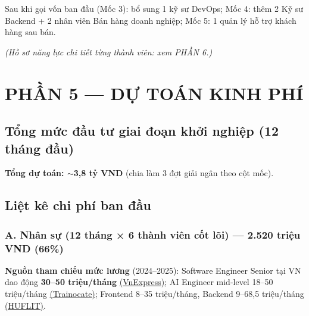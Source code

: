 \documentclass[11pt,a4paper]{article}
\begin{document}
Sau khi gọi vốn ban đầu (Mốc 3): bổ sung 1 kỹ sư DevOps; Mốc 4: thêm 2 Kỹ sư Backend + 2 nhân viên Bán hàng doanh nghiệp; Mốc 5: 1 quản lý hỗ trợ khách hàng sau bán.

\textit{(Hồ sơ năng lực chi tiết từng thành viên: xem PHẦN 6.)}

\newpage
\section{PHẦN 5 --- DỰ TOÁN KINH PHÍ}

\subsection{Tổng mức đầu tư giai đoạn khởi nghiệp (12 tháng đầu)}

\textbf{Tổng dự toán: $\sim$3,8 tỷ VND} (chia làm 3 đợt giải ngân theo cột mốc).

\subsection{Liệt kê chi phí ban đầu}

\subsubsection{A. Nhân sự (12 tháng × 6 thành viên cốt lõi) --- 2.520 triệu VND (66\%)}

\textbf{Nguồn tham chiếu mức lương} (2024--2025): Software Engineer Senior tại VN dao động \textbf{30--50 triệu/tháng} \href{https://vnexpress.net/khong-de-thanh-ky-su-ai-luong-thang-50-trieu-4796118.html}{(VnExpress)}; AI Engineer mid-level 18--50 triệu/tháng \href{https://trainocate.com.vn/luong-nganh-tri-tue-nhan-tao-a190}{(Trainocate)}; Frontend 8--35 triệu/tháng, Backend 9--68,5 triệu/tháng \href{https://huflit.edu.vn/vi/tin-tuc/luong-nganh-tri-tue-nhan-tao-ai/}{(HUFLIT)}.
\end{document}
